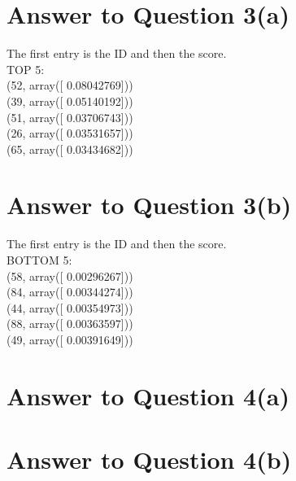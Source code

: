 \documentclass[11pt]{article}
\begin{document}
\section*{Answer to Question 3(a)}
The first entry is the ID and then the score.\\
TOP 5:\\
(52, array([ 0.08042769]))\\
(39, array([ 0.05140192]))\\
(51, array([ 0.03706743]))\\
(26, array([ 0.03531657]))\\
(65, array([ 0.03434682]))\\

\section*{Answer to Question 3(b)}
The first entry is the ID and then the score.\\
BOTTOM 5: \\
(58, array([ 0.00296267]))\\
(84, array([ 0.00344274]))\\
(44, array([ 0.00354973]))\\
(88, array([ 0.00363597]))\\
(49, array([ 0.00391649]))\\



\section*{Answer to Question 4(a)}

\section*{Answer to Question 4(b)}
\end{document}
